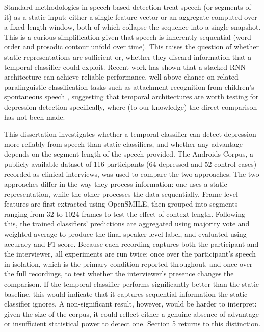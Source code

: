 \documentclass{mproj}
\begin{document}
Standard methodologies in speech-based detection treat speech (or segments of it) as a static input: either a single feature vector or an aggregate computed over a fixed-length window, both of which collapse the sequence into a single snapshot. This is a curious simplification given that speech is inherently sequential (word order and prosodic contour unfold over time). This raises the question of whether static representations are sufficient or, whether they discard information that a temporal classifier could exploit. Recent work has shown that a stacked RNN architecture can achieve reliable performance, well above chance on related paralinguistic classification tasks such as attachment recognition from children's spontaneous speech \cite{alsofyani2021}, suggesting that temporal architectures are worth testing for depression detection specifically, where (to our knowledge) the direct comparison has not been made.

This dissertation investigates whether a temporal classifier can detect depression more reliably from speech than static classifiers, and whether any advantage depends on the segment length of the speech provided. The Androids Corpus, a publicly available dataset of 116 participants (64 depressed and 52 control cases) recorded as clinical interviews, was used to compare the two approaches. The two approaches differ in the way they process information: one uses a static representation, while the other processes the data sequentially. Frame-level features are first extracted using OpenSMILE, then grouped into segments ranging from 32 to 1024 frames to test the effect of context length. Following this, the trained classifiers' predictions are aggregated using majority vote and weighted average to produce the final speaker-level label, and evaluated using accuracy and F1 score. Because each recording captures both the participant and the interviewer, all experiments are run twice: once over the participant's speech in isolation, which is the primary condition reported throughout, and once over the full recordings, to test whether the interviewer's presence changes the comparison. If the temporal classifier performs significantly better than the static baseline, this would indicate that it captures sequential information the static classifier ignores. A non-significant result, however, would be harder to interpret: given the size of the corpus, it could reflect either a genuine absence of advantage or insufficient statistical power to detect one. Section 5 returns to this distinction.
\end{document}
